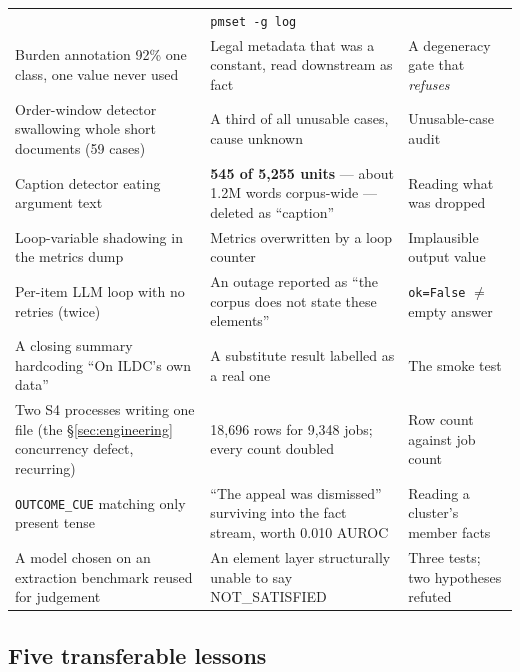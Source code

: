 \documentclass[12pt,a4paper]{article}
\newcommand{\code}[1]{\texttt{\small #1}}
\begin{document}
{\begin{longtable}{@{}p{4.3cm}p{5.3cm}p{4.6cm}@{}}
 & \code{pmset -g log} \\
\addlinespace
Burden annotation 92\% one class, one value never used
 & Legal metadata that was a constant, read downstream as fact
 & A degeneracy gate that \emph{refuses} \\
\addlinespace
Order-window detector swallowing whole short documents (59 cases)
 & A third of all unusable cases, cause unknown
 & Unusable-case audit \\
\addlinespace
Caption detector eating argument text
 & \textbf{545 of 5,255 units} --- about 1.2M words corpus-wide --- deleted as ``caption''
 & Reading what was dropped \\
\addlinespace
Loop-variable shadowing in the metrics dump
 & Metrics overwritten by a loop counter
 & Implausible output value \\
\addlinespace
Per-item LLM loop with no retries (twice)
 & An outage reported as ``the corpus does not state these elements''
 & \code{ok=False} $\neq$ empty answer \\
\addlinespace
A closing summary hardcoding ``On ILDC's own data''
 & A substitute result labelled as a real one
 & The smoke test \\
\addlinespace
Two S4 processes writing one file (the §\ref{sec:engineering} concurrency defect, recurring)
 & 18,696 rows for 9,348 jobs; every count doubled
 & Row count against job count \\
\addlinespace
\code{OUTCOME\_CUE} matching only present tense
 & ``The appeal was dismissed'' surviving into the fact stream, worth 0.010 AUROC
 & Reading a cluster's member facts \\
\addlinespace
A model chosen on an extraction benchmark reused for judgement
 & An element layer structurally unable to say NOT\_SATISFIED
 & Three tests; two hypotheses refuted \\
\bottomrule
\end{longtable}
}

\subsection{Five transferable lessons}
\end{document}

